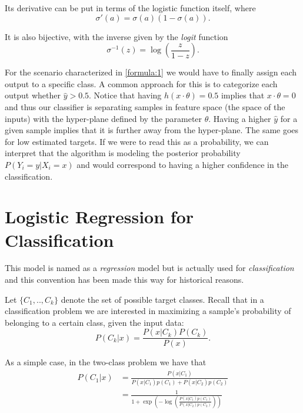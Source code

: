 Its derivative can be put in terms of the logistic function itself, where
\begin{equation}\label{eq:derivativeLogisticFunction}
\sigma '(a) = \sigma(a)( 1 - \sigma(a) ) .
\end{equation}

It is also bijective, with the inverse given by the \textit{logit} function
\begin{equation}\label{eq:logitFunction}
\sigma^{-1}(z) = \log( \frac{z}{1 - z}) .
\end{equation}

For the scenario characterized in \cref{formula:1} we would have to finally assign each output to a specific class. A common approach for this is to categorize each output whether $\hat{y} > 0.5$\label{formula:logitThreshold}. Notice that having $h(x \cdot \theta) = 0.5$ implies that $x \cdot \theta = 0$ and thus our classifier is separating samples in feature space (the space of the inputs) with the hyper-plane defined by the parameter $\theta$. Having a higher $\hat{y}$ for a given sample implies that it is further away from the hyper-plane. The same goes for low estimated targets. If we were to read this as a probability, we can interpret that the algorithm is modeling the posterior probability $P(Y_i = y | X_i = x)$ and would correspond to having a higher confidence in the classification.




\section{Logistic Regression for Classification}\label{section-logisticRegression}

This model is named as a \textit{regression} model but is actually used for \textit{classification} and this convention has been made this way for historical reasons.


Let $\{C_1,..,C_k\}$ denote the set of possible target classes. Recall that in a classification problem we are interested in maximizing a sample's probability of belonging to a certain class, given the input data:
\begin{equation}
P(C_k| x) = \frac{P(x|C_k)P(C_k)}{P(x)} .
\end{equation}

As a simple case, in the two-class problem we have that
\begin{equation}
\begin{split}
P(C_1| x) & = \frac{P(x|C_1) }{P(x|C_1)p(C_1) + P(x|C_2)p(C_2)} \\
& = \frac{1 }
{1 + \exp(- \log(  \frac{ P(x|C_1)p(C_1)}
{P(x|C_2)p(C_2)
}))
}
\end{split}
\end{equation}

